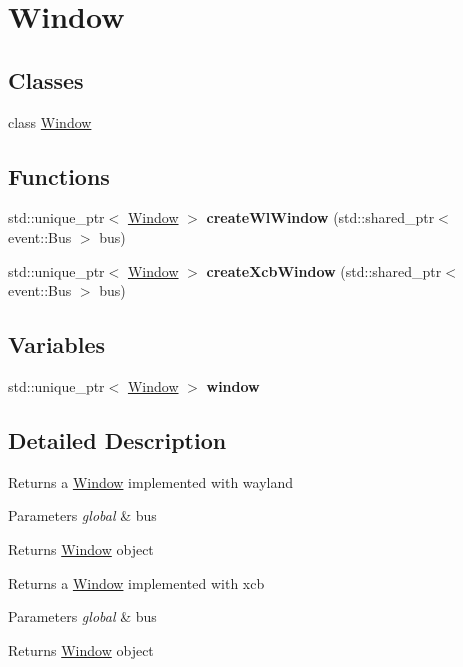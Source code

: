 \hypertarget{group__Window}{}\section{Window}
\label{group__Window}
\subsection*{Classes}
\begin{DoxyCompactItemize}
\item 
class \mbox{\hyperlink{classWindow}{Window}}
\end{DoxyCompactItemize}
\subsection*{Functions}
\begin{DoxyCompactItemize}
\item 
\mbox{\label{group__Window_gae7405bad5f194a339d31fe12f32029b4}} 
std\+::unique\+\_\+ptr$<$ \mbox{\hyperlink{classWindow}{Window}} $>$ {\bfseries create\+Wl\+Window} (std\+::shared\+\_\+ptr$<$ event\+::\+Bus $>$ bus)
\item 
\mbox{\label{group__Window_ga1f489491cdf4aaecd51da4acc36fb681}} 
std\+::unique\+\_\+ptr$<$ \mbox{\hyperlink{classWindow}{Window}} $>$ {\bfseries create\+Xcb\+Window} (std\+::shared\+\_\+ptr$<$ event\+::\+Bus $>$ bus)
\end{DoxyCompactItemize}
\subsection*{Variables}
\begin{DoxyCompactItemize}
\item 
\mbox{\label{group__Window_ga9065e9e2f7be15d04d2d656743eeba96}} 
std\+::unique\+\_\+ptr$<$ \mbox{\hyperlink{classWindow}{Window}} $>$ {\bfseries window}
\end{DoxyCompactItemize}


\subsection{Detailed Description}
Returns a \mbox{\hyperlink{classWindow}{Window}} implemented with wayland 
\begin{DoxyParams}{Parameters}
{\em global} & bus \\
\hline
\end{DoxyParams}
\begin{DoxyReturn}{Returns}
\mbox{\hyperlink{classWindow}{Window}} object
\end{DoxyReturn}
Returns a \mbox{\hyperlink{classWindow}{Window}} implemented with xcb 
\begin{DoxyParams}{Parameters}
{\em global} & bus \\
\hline
\end{DoxyParams}
\begin{DoxyReturn}{Returns}
\mbox{\hyperlink{classWindow}{Window}} object 
\end{DoxyReturn}
